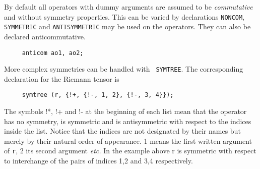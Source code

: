 By default all operators with dummy arguments are assumed to be {\em
commutative} and without symmetry properties.  This can be varied by
declarations {\tt NONCOM}, {\tt SYMMETRIC} and {\tt AN\-TI\-SYM\-ME\-TRIC}
 may be  used on the
operators.
They can also be declared anticommutative.
\begin{verbatim}
     anticom ao1, ao2;
\end{verbatim}

More complex symmetries can be handled with {\tt
SYMTREE}.
The corresponding declaration for the Riemann tensor is
\begin{verbatim}
     symtree (r, {!+, {!-, 1, 2}, {!-, 3, 4}});
\end{verbatim}
The symbols !*, !+ and !- at the beginning of each list mean that the
operator has no symmetry, is symmetric and is antisymmetric with
respect to the indices inside the list.  Notice that the indices are
not designated by their names but merely by their natural order of
appearance.  1 means the first written argument of {\tt r}, 2 its
second argument {\em etc.}  In the example above r is symmetric with
respect to interchange of the pairs of indices 1,2 and 3,4
respectively.

